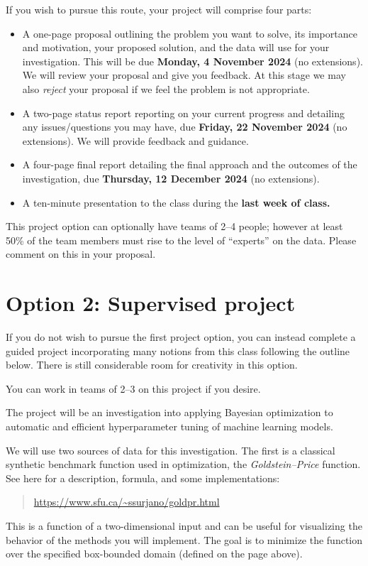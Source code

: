 \documentclass{article}
\begin{document}
If you wish to pursue this route, your project will comprise four parts:

\begin{itemize}
\item
  A one-page proposal outlining the problem you want to solve, its importance
  and motivation, your proposed solution, and the data will use for your
  investigation. This will be due \textbf{Monday, 4 November 2024} (no
  extensions). We will review your proposal and give you feedback.  At this
  stage we may also \emph{reject} your proposal if we feel the problem is not
  appropriate.
\item
  A two-page status report reporting on your current progress and detailing any
  issues/questions you may have, due \textbf{Friday, 22 November 2024} (no
  extensions).  We will provide feedback and guidance.
\item
  A four-page final report detailing the final approach and the outcomes of the
  investigation, due \textbf{Thursday, 12 December 2024} (no extensions).
\item
  A ten-minute presentation to the class during the \textbf{last week of class.}
\end{itemize}

This project option can optionally have teams of 2--4 people; however at least
50\% of the team members must rise to the level of ``experts'' on the
data. Please comment on this in your proposal.

\clearpage

\section*{Option 2: Supervised project}

If you do not wish to pursue the first project option, you can instead complete
a guided project incorporating many notions from this class following the
outline below. There is still considerable room for creativity in this option.

You can work in teams of 2--3 on this project if you desire.

The project will be an investigation into applying Bayesian optimization to
automatic and efficient hyperparameter tuning of machine learning models.

We will use two sources of data for this investigation. The first is a classical
synthetic benchmark function used in optimization, the \emph{Goldstein--Price}
function.  See here for a description, formula, and some implementations:
\begin{quote}
  \url{https://www.sfu.ca/~ssurjano/goldpr.html}
\end{quote}
This is a function of a two-dimensional input and can be useful for visualizing
the behavior of the methods you will implement. The goal is to minimize the
function over the specified box-bounded domain (defined on the page above).
\end{document}
